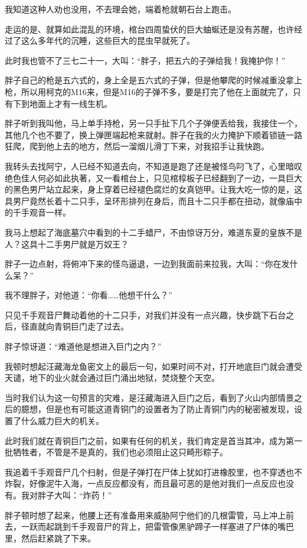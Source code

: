 我知道这种人劝也没用，不去理会她，端着枪就朝石台上跑击。

走运的是、就算如此混乱的环境，棺台四周蛰伏的巨大蚰蜒还是没有苏醒，也许经过了这么多年代的沉睡，这些巨大的昆虫早就死了。

此时我也管不了三七二十一，大叫：“胖子，把五六的子弹给我！我掩护你！”

胖子自己的枪是五六式的，身上全是五六式的子弹，但是他攀爬的时候减重没拿上枪，所以用柯克的M16来，但是M16的子弹不多，要是打完了他在上面就完了，只有下到地面上才有一线生机。

胖子听到我叫他，马上单手持枪，另一只手扯下几个子弹便丢给我，我接住一个，其他几个也不要了，换上弹匣端起枪来就射。胖子在我的火力掩护下顺着锁链一路狂爬，爬到他上去的地方，然后一溜烟儿滑丁下来，对我招手让我快跑。

我转头去找阿宁，人已经不知道去向，不知道是跑了还是被怪鸟叼飞了，心里暗叹绝色佳人何必如此执著，又一看棺台上，只见棺椁板子已经翻到了一边，一具巨大的黑色男尸站立起来，身上穿着已经褪色腐烂的女真铠甲。让我大吃一惊的是，这具男尸竟然长着十二只手，呈环形排列在身后，而且十二只手都在扭动，就像庙中的千手观音一样。

我马上想起了海底墓穴中看到的十二手蜡尸，不由惊讶万分，难道东夏的皇族不是人？这具十二手男尸就是万奴王？

胖子一边点射，将俯冲下来的怪鸟逼退，一边到我面前来拉我，大叫：“你在发什么呆？”

我不理胖子，对他道：“你看……他想干什么？”

只见千手观音尸舞动着他的十二只手，对我们并没有一点兴趣，快步跳下石台之后，径直就向青铜巨门走了过去。

胖子惊讶道：“难道他是想进入巨门之内？”

我顿时想起汪藏海龙鱼密文上的最后一句，如果时间不对，打开地底巨门就会遭受天谴，地下的业火就会通过巨门涌出地狱，焚烧整个天空。

当时我们认为这一句预言的灾难，是汪藏海进入巨门之后，看到了火山内部情景之后的臆想，但是也有可能这道青铜门的设置者为了防止青铜门内的秘密被发现，设置了什么威力巨大的机关。

此时我们就在青铜巨门之前，如果有任何的机关，我们肯定是首当其冲，成为第一批牺牲者，不管是不是真的，我们也必须阻止这只畸形粽子。

我追着千手观音尸几个扫射，但是子弹打在尸体上犹如打进橡胶里，也不穿透也不炸裂，好像泥牛入海，一点反应都没有，而且最可恶的是他对我们一点反应也没有。我对胖子大叫：“炸药！”

胖子顿时想了起来，他腰上还有准备用来威胁阿宁他们的几根雷管，马上冲上前去，一跃而起跳到千手观音尸的背上，把雷管像黑驴蹄子一样塞进了尸体的嘴巴里，然后赶紧跳了下来。

